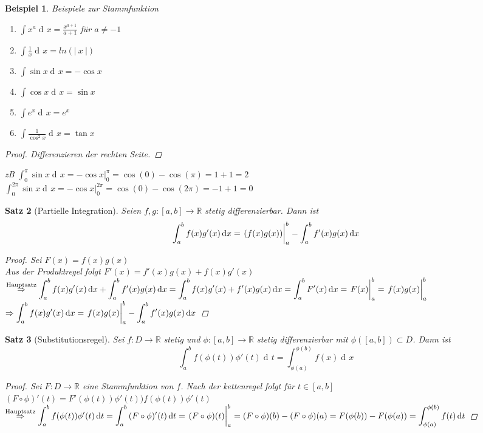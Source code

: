 \documentclass[a4paper,titlepage,oneside]{article}
\def\R{\ensuremath{\mathbb{R}} }
\def\e{\ensuremath{\mathit{e}} }
\newcommand{\der}{\operatorname{d\!}{}}
\newcommand{\abs}[1]{\ensuremath{\left|\:#1\:\right|}}
\newcommand{\integral}[4][x]{\ensuremath{\int_{#2}^{#3}{#4\der #1}}}
\newcommand{\intAB}[2][x]{\integral[#1]{a}{b}{#2}}
\newcommand{\stamm}[3]{\ensuremath{\left.\vphantom{\frac{1}{n}}#3\right|_{#1}^{#2}}}
\theoremstyle{thmstyle}
\newtheorem{satz}{Satz}[section]
\newtheorem{bsp}[satz]{Beispiel}
\theoremstyle{subthmstyle}
\begin{document}
\begin{bsp}
Beispiele zur Stammfunktion
\begin{enumerate}
\item $\displaystyle \int{x^a \der x} = \frac{x^{a+1}}{a+1} $ für $ a \ne -1$
\item $\displaystyle \int{\frac{1}{x} \der x} = ln(\abs{x})$
\item $\displaystyle \int{\sin x \der x} = - \cos x$
\item $\displaystyle \int{\cos x \der x} = \sin x$
\item $\displaystyle \int{\e^x \der x} =  \e^x$
\item $\displaystyle \int{\frac{1}{\cos^2x} \der x} =  \tan x$
\end{enumerate}
\begin{proof}
Differenzieren der rechten Seite.
\end{proof}
zB $\displaystyle\int_{0}^{\pi}{\sin x \der x} = - \cos x  |_0^{\pi} = \cos(0) - \cos(\pi) = 1 +1 = 2$\\
$\displaystyle\int_{0}^{2\pi}{\sin x \der x} = - \cos x  |_0^{2\pi} = \cos(0) - \cos(2\pi) = -1 +1 = 0$
\end{bsp}

\begin{satz}[Partielle Integration]
Seien $f,g : [a,b] \to \R$ stetig differenzierbar. Dann ist \[\intAB{f(x)g'(x)} = \stamm{a}{b}{(f(x) g(x))} - \intAB{f'(x)g(x)}\]
\begin{proof}
Sei $F(x) = f(x)g(x)$\\
Aus der Produktregel folgt $F'(x) = f'(x) g(x) + f(x) g'(x)$\\
$\displaystyle\overset{\text{Hauptsatz}}{\Rightarrow} \intAB{f(x)g'(x)} + \intAB{f'(x)g(x)} = \intAB{f(x)g'(x) + f'(x)g(x)} = \intAB{F'(x)} = \stamm{a}{b}{F(x)} = \stamm{a}{b}{f(x)g(x)} $\\
$\displaystyle\Rightarrow \intAB{f(x)g'(x)} = \stamm{a}{b}{f(x)g(x)} - \intAB{f'(x)g(x)} $
\end{proof}
\end{satz}

\begin{satz}[Substitutionsregel]
Sei $f : D \to \R$ stetig und $\phi: [a,b] \to \R$ stetig differenzierbar mit $\phi([a,b]) \subset D$. Dann ist \[ \int_{a}^{b}{f(\phi(t))\phi'(t) \der t} = \integral{\phi(a)}{\phi(b)}{f(x)}\]
\begin{proof}
Sei $F: D \to \R$ eine Stammfunktion von $f$. Nach der kettenregel folgt für $t \in [a,b]$ \\
$\displaystyle (F \circ \phi)'(t) = F'(\phi(t))\phi'(t) ) f(\phi(t))\phi'(t)$\\
$\displaystyle\overset{\text{Hauptsatz}}{\Rightarrow} \intAB[t]{f(\phi(t))\phi'(t)} = \intAB[t]{(F\circ\phi)'(t)} = \stamm{a}{b}{(F\circ\phi)(t)} = (F\circ\phi)(b) - (F\circ\phi)(a) = F(\phi(b)) - F(\phi(a)) = \integral[t]{\phi(a)}{\phi(b)}{f(t)}$
\end{proof}
\end{satz}
\end{document}
